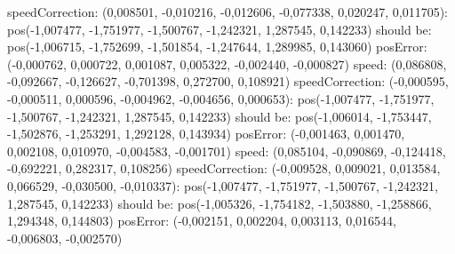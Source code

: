 \hspace{1cm}	speedCorrection: (0,008501, -0,010216, -0,012606, -0,077338, 0,020247, 0,011705)\newline 
[1,528000s - Step 191/251]:\newline 
\hspace{1cm}	pos(-1,007477, -1,751977, -1,500767, -1,242321, 1,287545, 0,142233) should be: \newline 
\hspace{1cm}	pos(-1,006715, -1,752699, -1,501854, -1,247644, 1,289985, 0,143060)\newline 
\hspace{1cm}	posError: (-0,000762, 0,000722, 0,001087, 0,005322, -0,002440, -0,000827)\newline 
\hspace{1cm}	speed: (0,086808, -0,092667, -0,126627, -0,701398, 0,272700, 0,108921)\newline 
\hspace{1cm}	speedCorrection: (-0,000595, -0,000511, 0,000596, -0,004962, -0,004656, 0,000653)\newline 
[1,536000s - Step 192/251]:\newline 
\hspace{1cm}	pos(-1,007477, -1,751977, -1,500767, -1,242321, 1,287545, 0,142233) should be: \newline 
\hspace{1cm}	pos(-1,006014, -1,753447, -1,502876, -1,253291, 1,292128, 0,143934)\newline 
\hspace{1cm}	posError: (-0,001463, 0,001470, 0,002108, 0,010970, -0,004583, -0,001701)\newline 
\hspace{1cm}	speed: (0,085104, -0,090869, -0,124418, -0,692221, 0,282317, 0,108256)\newline 
\hspace{1cm}	speedCorrection: (-0,009528, 0,009021, 0,013584, 0,066529, -0,030500, -0,010337)\newline 
[1,544000s - Step 193/251]:\newline 
\hspace{1cm}	pos(-1,007477, -1,751977, -1,500767, -1,242321, 1,287545, 0,142233) should be: \newline 
\hspace{1cm}	pos(-1,005326, -1,754182, -1,503880, -1,258866, 1,294348, 0,144803)\newline 
\hspace{1cm}	posError: (-0,002151, 0,002204, 0,003113, 0,016544, -0,006803, -0,002570)\newline 
